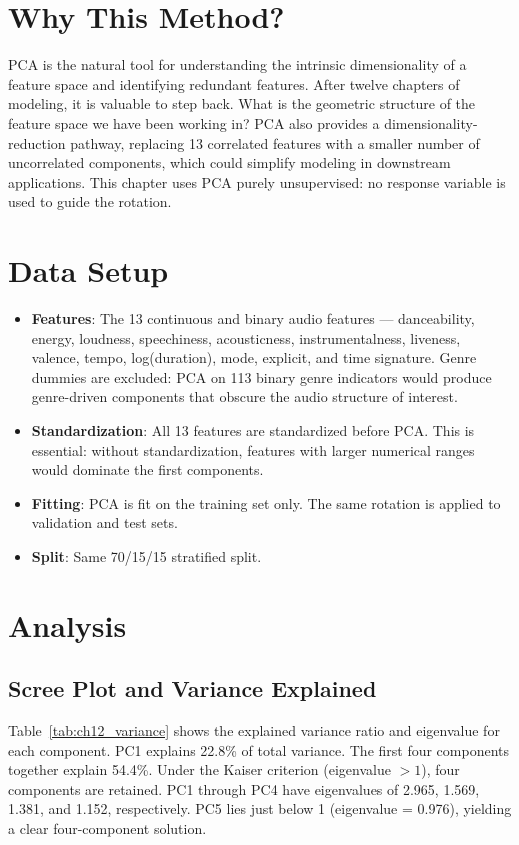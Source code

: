 \documentclass[12pt, oneside]{book}
\begin{document}
\section{Why This Method?}
 
PCA is the natural tool for understanding the intrinsic dimensionality of a feature space and identifying redundant features. After twelve chapters of modeling, it is valuable to step back. What is the geometric structure of the feature space we have been working in? PCA also provides a dimensionality-reduction pathway, replacing 13 correlated features with a smaller number of uncorrelated components, which could simplify modeling in downstream applications. This chapter uses PCA purely unsupervised: no response variable is used to guide the rotation.
 
\section{Data Setup}
 
\begin{itemize}
    \item \textbf{Features}: The 13 continuous and binary audio features --- danceability, energy, loudness, speechiness, acousticness, instrumentalness, liveness, valence, tempo, log(duration), mode, explicit, and time signature. Genre dummies are excluded: PCA on 113 binary genre indicators would produce genre-driven components that obscure the audio structure of interest.
    \item \textbf{Standardization}: All 13 features are standardized before PCA. This is essential: without standardization, features with larger numerical ranges would dominate the first components.
    \item \textbf{Fitting}: PCA is fit on the training set only. The same rotation is applied to validation and test sets.
    \item \textbf{Split}: Same 70/15/15 stratified split.
\end{itemize}
 
\section{Analysis}
 
\subsection{Scree Plot and Variance Explained}
 
Table~\ref{tab:ch12_variance} shows the explained variance ratio and eigenvalue for each component. PC1 explains 22.8\% of total variance. The first four components together explain 54.4\%. Under the Kaiser criterion (eigenvalue $> 1$), four components are retained. PC1 through PC4 have eigenvalues of 2.965, 1.569, 1.381, and 1.152, respectively. PC5 lies just below 1 (eigenvalue = 0.976), yielding a clear four-component solution.
 
\end{document}
